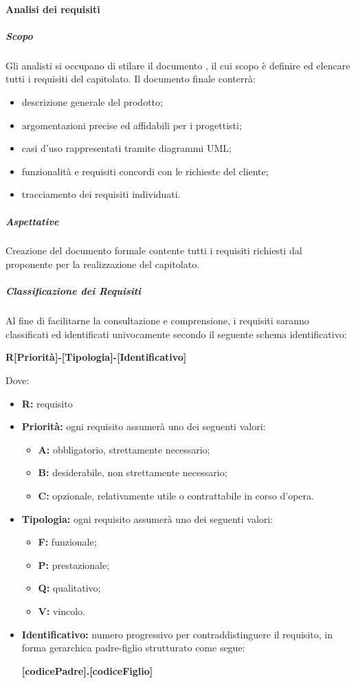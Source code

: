 			\paragraph{Analisi dei requisiti}
				\subparagraph{Scopo}
					Gli analisti si occupano di stilare il documento , il cui scopo è definire ed elencare tutti i requisiti del capitolato. Il documento finale conterrà:
					\begin{itemize}
						\item descrizione generale del prodotto;
						\item argomentazioni precise ed affidabili per i progettisti;
						\item casi d'uso rappresentati tramite diagrammi UML;
						\item funzionalità e requisiti concordi con le richieste del cliente;
						\item tracciamento dei requisiti individuati.
					\end{itemize}
				\subparagraph{Aspettative}
					Creazione del documento formale contente tutti i requisiti richiesti dal proponente per la realizzazione del capitolato.
				\subparagraph{Classificazione dei Requisiti}
					Al fine di facilitarne la consultazione e comprensione, i requisiti saranno classificati ed identificati univocamente secondo il seguente schema identificativo:
					\begin{center}
						\textbf{R[Priorità]-[Tipologia]-[Identificativo]}
					\end{center}
					Dove:
					\begin{itemize}
						\item \textbf{R:} requisito
						\item \textbf{Priorità:} ogni requisito assumerà uno dei seguenti valori:
						\begin{itemize}
							\item \textbf{A:} obbligatorio, strettamente necessario;
							\item \textbf{B:} desiderabile, non strettamente necessario;
							\item \textbf{C:} opzionale, relativamente utile o contrattabile in corso d'opera.
						\end{itemize}
						\item \textbf{Tipologia:} ogni requisito assumerà uno dei seguenti valori:
						\begin{itemize}
							\item \textbf{F:} funzionale;
							\item \textbf{P:} prestazionale;
							\item \textbf{Q:} qualitativo;
							\item \textbf{V:} vincolo.
						\end{itemize}
						\item \textbf{Identificativo:} numero progressivo per contraddistinguere il requisito, in forma gerarchica padre-figlio strutturato come segue:
						\begin{center}
							\textbf{[codicePadre].[codiceFiglio]}
						\end{center}
					\end{itemize}
